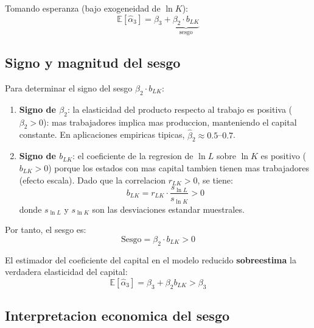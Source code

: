 \documentclass[12pt, letterpaper]{article}
\theoremstyle{remark}
\newcommand{\E}{\mathbb{E}}
\begin{document}
Tomando esperanza (bajo exogeneidad de $\ln K$):
\begin{equation}
  \boxed{
    \E[\hat\alpha_3] = \beta_3 + \underbrace{\beta_2 \cdot b_{LK}}_{\text{sesgo}}
  }
  \label{eq:sesgo}
\end{equation}

\subsection{Signo y magnitud del sesgo}

Para determinar el signo del sesgo $\beta_2 \cdot b_{LK}$:

\begin{enumerate}[leftmargin=1.8em, itemsep=6pt]
  \item \textbf{Signo de $\beta_2$}: la elasticidad del producto respecto
    al trabajo es positiva ($\beta_2 > 0$): mas trabajadores implica mas
    produccion, manteniendo el capital constante. En aplicaciones empiricas
    tipicas, $\hat\beta_2 \approx 0.5$--$0.7$.

  \item \textbf{Signo de $b_{LK}$}: el coeficiente de la regresion de
    $\ln L$ sobre $\ln K$ es positivo ($b_{LK} > 0$) porque los estados
    con mas capital tambien tienen mas trabajadores (efecto escala). Dado
    que la correlacion $r_{LK} > 0$, se tiene:
    \begin{equation}
      b_{LK} = r_{LK} \cdot \frac{s_{\ln L}}{s_{\ln K}} > 0
      \label{eq:b_LK_corr}
    \end{equation}
    donde $s_{\ln L}$ y $s_{\ln K}$ son las desviaciones estandar muestrales.
\end{enumerate}

Por tanto, el sesgo es:
\begin{equation}
  \text{Sesgo} = \beta_2 \cdot b_{LK} > 0
  \label{eq:sesgo_positivo}
\end{equation}

El estimador del coeficiente del capital en el modelo reducido \textbf{sobreestima}
la verdadera elasticidad del capital:
\begin{equation}
  \E[\hat\alpha_3] = \beta_3 + \beta_2 b_{LK} > \beta_3
  \label{eq:sobreestimacion}
\end{equation}

\subsection{Interpretacion economica del sesgo}
\end{document}
